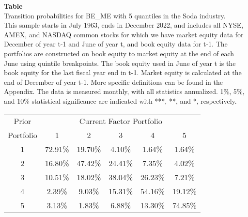 \begin{table*}[ht!]
\raggedright
{}
\label{tab: transition_probs_BE_ME_Soda_with_5_quantiles}
\textbf{Table \thetable} \\
Transition probabilities for BE_ME with 5 quantiles in the Soda industry. \\
\hspace*{1em}This sample starts in July 1963, ends in December 2022, and includes all NYSE, AMEX, and NASDAQ common stocks for which we have market equity data for December of year t-1 and June of year t, and book equity data for t-1. The portfolios are constructed on book equity to market equity at the end of each June using quintile breakpoints.  The book equity used in June of year t is the book equity for the last fiscal year end in t-1.  Market equity is calculated at the end of December of year t-1.  More specific definitions can be found in the Appendix.  The data is measured monthly, with all statistics annualized.  1\%, 5\%, and 10\% statistical significance are indicated with ***, **, and *, respectively. \\
\vspace{0.5em}
\centering
\begin{adjustbox}{max width=\textwidth}
\begin{tabular}{@{}cccccc@{}}
\toprule
Prior & \multicolumn{5}{c}{Current Factor Portfolio} \\
Portfolio & 1 & 2 & 3 & 4 & 5 \\
\midrule
1 & 72.91\% & 19.70\% & 4.10\% & 1.64\% & 1.64\% \\
2 & 16.80\% & 47.42\% & 24.41\% & 7.35\% & 4.02\% \\
3 & 10.51\% & 18.02\% & 38.04\% & 26.23\% & 7.21\% \\
4 & 2.39\% & 9.03\% & 15.31\% & 54.16\% & 19.12\% \\
5 & 3.13\% & 1.83\% & 6.88\% & 13.30\% & 74.85\% \\
\bottomrule
\end{tabular}
\end{adjustbox}
\end{table*}